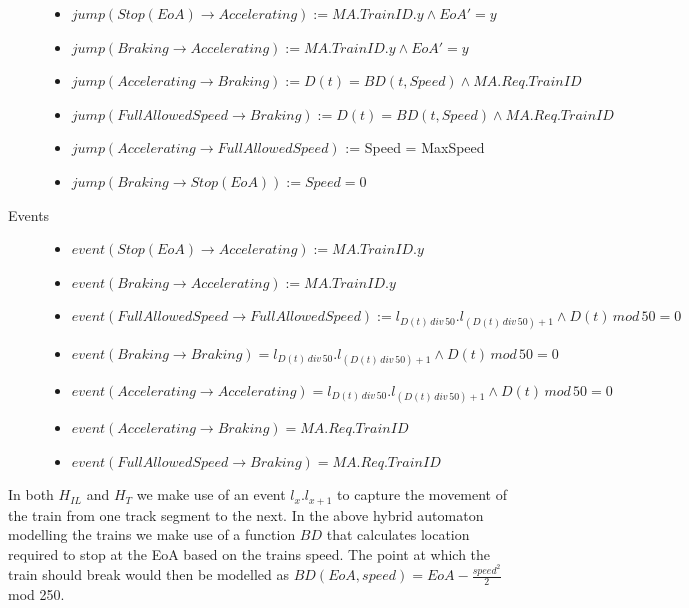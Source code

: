 \begin{mydef}
\begin{description}
\begin{itemize}
	\item $jump(Stop (EoA) \to Accelerating) := MA.TrainID.y \wedge EoA' = y$ 
	
	\item $jump(Braking \to Accelerating) := MA.TrainID.y \wedge EoA' = y$ 

	\item $jump(Accelerating \to Braking) := D(t) = BD(t, Speed) \wedge MA.Req.TrainID$

	\item $jump(Full Allowed Speed \to Braking) := D(t) = BD(t, Speed) \wedge MA.Req.TrainID$

	\item $jump(Accelerating \to Full Allowed Speed)$ := Speed = MaxSpeed
	
	\item $jump(Braking \to Stop (EoA)) := Speed = 0$

	\end{itemize}

\item[Events] \hspace*{0mm}
\begin{itemize}
	\item $event (Stop (EoA) \to Accelerating) := MA.TrainID.y$
	\item $event (Braking \to Accelerating) := MA.TrainID.y$
	\item $event(Full Allowed Speed \to Full Allowed Speed) := l_{D(t) \, div \, 50}.l_{(D(t) \, div \, 50) +1} \wedge D(t) \, mod \, 50 = 0$
\item $event(Braking \to Braking) = l_{D(t) \, div \, 50}.l_{(D(t) \, div \, 50) +1} \wedge D(t) \, mod \, 50 = 0$
\item $event(Accelerating \to Accelerating) = l_{D(t) \, div \, 50}.l_{(D(t) \, div \, 50) +1} \wedge D(t) \, mod \, 50 = 0$

	\item $event(Accelerating \to Braking) = MA.Req.TrainID$
	\item $event(Full Allowed Speed \to Braking) = MA.Req.TrainID$
\end{itemize}

\end{description}
\end{mydef}

In both $H_{IL}$ and $H_T$ we make use of an event $l_x.l_{x+1}$ to capture the movement of the train from one track segment to the next. In the above hybrid automaton modelling the trains we make use of a function $BD$ that calculates location required to stop at the EoA based on the trains speed. The point at which the train should break would then be modelled as $BD(EoA, speed) = EoA - \frac{speed ^2}{2}$ mod 250.



